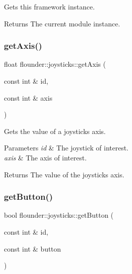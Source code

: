 Gets this framework instance. 

\begin{DoxyReturn}{Returns}
The current module instance. 
\end{DoxyReturn}
\mbox{\label{classflounder_1_1joysticks_a67c5fd2f77004c37cf1720c985c9d6f9}} 
\subsubsection{\texorpdfstring{get\+Axis()}{getAxis()}}
{\footnotesize\ttfamily float flounder\+::joysticks\+::get\+Axis (\begin{DoxyParamCaption}\item[{const int \&}]{id,  }\item[{const int \&}]{axis }\end{DoxyParamCaption})}



Gets the value of a joysticks axis. 


\begin{DoxyParams}{Parameters}
{\em id} & The joystick of interest. \\
\hline
{\em axis} & The axis of interest. \\
\hline
\end{DoxyParams}
\begin{DoxyReturn}{Returns}
The value of the joystick\textquotesingle{}s axis. 
\end{DoxyReturn}
\mbox{\label{classflounder_1_1joysticks_a908373adb0a8ca4818b7d49b273d4622}} 
\subsubsection{\texorpdfstring{get\+Button()}{getButton()}}
{\footnotesize\ttfamily bool flounder\+::joysticks\+::get\+Button (\begin{DoxyParamCaption}\item[{const int \&}]{id,  }\item[{const int \&}]{button }\end{DoxyParamCaption})}



